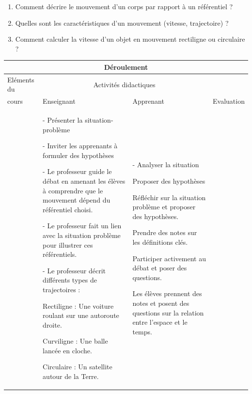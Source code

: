 \documentclass[14pt]{article}
\begin{document}
\begin{enumerate}
  \item Comment décrire le mouvement d’un corps par rapport à un référentiel ?
  \item Quelles sont les caractéristiques d’un mouvement (vitesse, trajectoire) ?
  \item Comment calculer la vitesse d’un objet en mouvement rectiligne ou circulaire ?
\end{enumerate}

\begin{center}
	 \begin{tabular}{|p{}||p{}||p{}||p{}|}
\hline
\multicolumn{4}{|c|}{Déroulement}\\\hline
Eléments du & \multicolumn{2}{c||}{Activités didactiques} &  \\\cline{2-3}
cours & Enseignant & Apprenant & Evaluation\\\hline

\color{red}{I-Introduction : Relativité du mouvement: 

     }	  &

- Présenter la situation-problème

- Inviter les apprenants à formuler des hypothèses

 - Le professeur guide le débat en amenant les élèves à comprendre que le mouvement dépend du référentiel choisi.

- Le professeur fait un lien avec la situation problème pour illustrer ces référentiels.

- Le professeur décrit différents types de trajectoires :

Rectiligne : Une voiture roulant sur une autoroute droite.

Curviligne : Une balle lancée en cloche.

Circulaire : Un satellite autour de la Terre.


				  &
           - Analyser la situation

           Proposer des hypothèses

Réfléchir sur la situation problème et proposer des hypothèses.

Prendre des notes sur les définitions clés.

Participer activement au débat et poser des questions.

Les élèves prennent des notes et posent des questions sur la relation entre l’espace et le temps.


\end{tabular}
\end{center}
\end{document}
